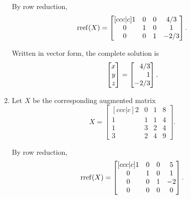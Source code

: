 \begin{exercises}
\begin{problist}
\begin{solution}
\begin{enumerate}
				By row reduction,
				\[
					\operatorname{rref}(X)=
					\begin{bmatrix}[ccc|c]
						1 & 0 & 0 & 4/3\\
						0 & 1 & 0 & 1\\
						0 & 0 & 1 & -2/3
					\end{bmatrix}.
				\]
				
				Written in vector form, the complete solution is
				\[
					\mat{x\\y\\z} = \mat{4/3\\1\\-2/3}.
				\]
				\item 
				Let $X$ be the corresponding augmented matrix
				\[
					X=
					\begin{bmatrix}[ccc|c]
						2 & 0 & 1 & 8\\
						1 & 1 & 1 & 4\\
						1 & 3 & 2 & 4\\
						3 & 2 & 4 & 9
					\end{bmatrix}.
				\]
				
				By row reduction,
				\[
					\operatorname{rref}(X)=
					\begin{bmatrix}[ccc|c]
						1 & 0 & 0 & 5\\
						0 & 1 & 0 & 1\\
						0 & 0 & 1 & -2\\
						0 & 0 & 0 & 0
					\end{bmatrix}.
				\]
				

\end{enumerate}
\end{solution}
\end{problist}
\end{exercises}
